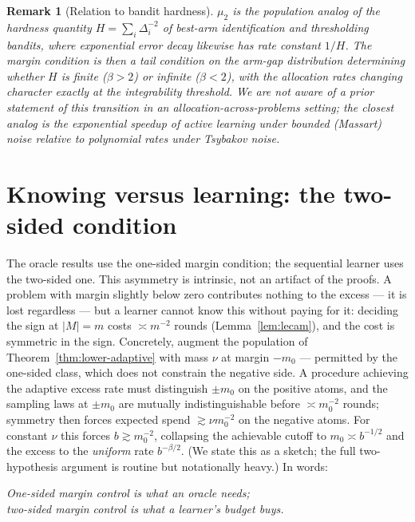 \documentclass[11pt]{article}
\newtheorem{remark}{Remark}
\begin{document}
\begin{remark}[Relation to bandit hardness]
$\mu_2$ is the population analog of the hardness quantity
$H=\sum_i\Delta_i^{-2}$ of best-arm identification and thresholding
bandits, where exponential error decay likewise has rate constant $1/H$.
The margin condition is then a tail condition on the arm-gap distribution
determining whether $H$ is finite ($\beta>2$) or infinite ($\beta<2$), with
the allocation rates changing character exactly at the integrability
threshold.  We are not aware of a prior statement of this transition in an
allocation-across-problems setting; the closest analog is the exponential
speedup of active learning under bounded (Massart) noise relative to
polynomial rates under Tsybakov noise.
\end{remark}

\section{Knowing versus learning: the two-sided condition}
\label{sec:twosided}

The oracle results use the one-sided margin condition; the sequential
learner uses the two-sided one.  This asymmetry is intrinsic, not an
artifact of the proofs.  A problem with margin slightly below zero
contributes nothing to the excess --- it is lost regardless --- but a learner
cannot know this without paying for it: deciding the sign at $|M|=m$ costs
$\asymp m^{-2}$ rounds (Lemma~\ref{lem:lecam}), and the cost is symmetric in
the sign.  Concretely, augment the population of
Theorem~\ref{thm:lower-adaptive} with mass $\nu$ at margin $-m_0$ ---
permitted by the one-sided class, which does not constrain the negative
side.  A procedure achieving the adaptive excess rate must distinguish
$\pm m_0$ on the positive atoms, and the sampling laws at $\pm m_0$ are
mutually indistinguishable before $\asymp m_0^{-2}$ rounds; symmetry then
forces expected spend $\gtrsim\nu m_0^{-2}$ on the negative atoms.  For
constant $\nu$ this forces $b\gtrsim m_0^{-2}$, collapsing the achievable
cutoff to $m_0\asymp b^{-1/2}$ and the excess to the \emph{uniform} rate
$b^{-\beta/2}$.  (We state this as a sketch; the full two-hypothesis
argument is routine but notationally heavy.)  In words:

\begin{center}
\emph{One-sided margin control is what an oracle needs;\\
two-sided margin control is what a learner's budget buys.}
\end{center}
\end{document}
